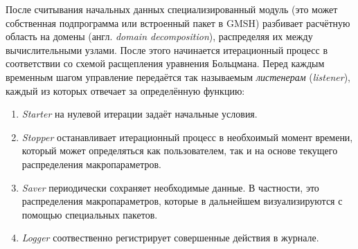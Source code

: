 После считывания начальных данных специализированный модуль (это может собственная подпрограмма или встроенный пакет в GMSH)
разбивает расчётную область на домены (англ. \textit{domain decomposition}), распределяя их между вычислительными узлами.
После этого начинается итерационный процесс в соответствии со схемой расщепления уравнения Больцмана.
Перед каждым временн\textit{ы}м шагом управление передаётся так называемым \textit{листенерам} (\textit{listener}),
каждый из которых отвечает за определённую функцию:
\begin{enumerate}
	\item \textit{Starter} на нулевой итерации задаёт начальные условия.
	\item \textit{Stopper} останавливает итерационный процесс в необхоимый момент времени,
		который может определяться как пользователем, так и на основе текущего распределения макропараметров.
	\item \textit{Saver} периодически сохраняет необходимые данные. В частности, это распределения макропараметров,
		которые в дальнейшем визуализируются с помощью специальных пакетов.
	\item \textit{Logger} соотвественно регистрирует совершенные действия в журнале.
\end{enumerate}
